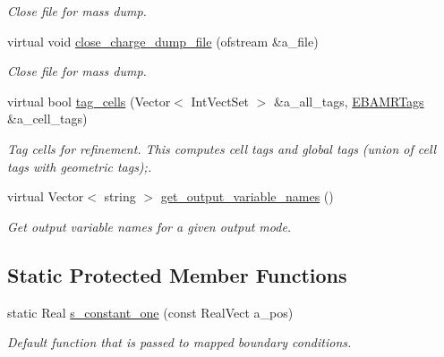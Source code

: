 \begin{DoxyCompactItemize}
\begin{DoxyCompactList}\small\item\em Close file for mass dump. \end{DoxyCompactList}\item 
virtual void \hyperlink{classplasma__engine_a04142baed7daf7645ea6b24a348322b1}{close\+\_\+charge\+\_\+dump\+\_\+file} (ofstream \&a\+\_\+file)
\begin{DoxyCompactList}\small\item\em Close file for mass dump. \end{DoxyCompactList}\item 
virtual bool \hyperlink{classplasma__engine_a6e1e034eceaefc352efc1a0570e77827}{tag\+\_\+cells} (Vector$<$ Int\+Vect\+Set $>$ \&a\+\_\+all\+\_\+tags, \hyperlink{type__definitions_8H_a4eb540da9eb275c3e4225830ae526113}{E\+B\+A\+M\+R\+Tags} \&a\+\_\+cell\+\_\+tags)
\begin{DoxyCompactList}\small\item\em Tag cells for refinement. This computes cell tags and global tags (union of cell tags with geometric tags);. \end{DoxyCompactList}\item 
virtual Vector$<$ string $>$ \hyperlink{classplasma__engine_ac0e853ddf9b8c261daf97d0c31e8d454}{get\+\_\+output\+\_\+variable\+\_\+names} ()
\begin{DoxyCompactList}\small\item\em Get output variable names for a given output mode. \end{DoxyCompactList}\end{DoxyCompactItemize}
\subsection*{Static Protected Member Functions}
\begin{DoxyCompactItemize}
\item 
static Real \hyperlink{classplasma__engine_a478da7696c3939e3e104202ac3d7a8f0}{s\+\_\+constant\+\_\+one} (const Real\+Vect a\+\_\+pos)
\begin{DoxyCompactList}\small\item\em Default function that is passed to mapped boundary conditions. \end{DoxyCompactList}\end{DoxyCompactItemize}
